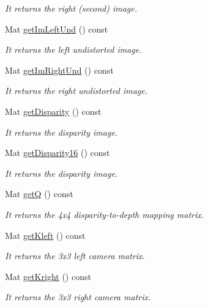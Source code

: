 \begin{DoxyCompactItemize}
\begin{DoxyCompactList}\small\item\em It returns the right (second) image. \end{DoxyCompactList}\item 
Mat \hyperlink{classStereoCamera_a8beef7e6d56b98f531ceeb2ed6778c28}{get\+Im\+Left\+Und} () const 
\begin{DoxyCompactList}\small\item\em It returns the left undistorted image. \end{DoxyCompactList}\item 
Mat \hyperlink{classStereoCamera_a915c0da2c83bca6776152e8d0205e9d1}{get\+Im\+Right\+Und} () const 
\begin{DoxyCompactList}\small\item\em It returns the right undistorted image. \end{DoxyCompactList}\item 
Mat \hyperlink{classStereoCamera_a7e9dc528c0a2b8d587fbe80738063a34}{get\+Disparity} () const 
\begin{DoxyCompactList}\small\item\em It returns the disparity image. \end{DoxyCompactList}\item 
Mat \hyperlink{classStereoCamera_af77824b3c5785cac11e585ef698c2537}{get\+Disparity16} () const 
\begin{DoxyCompactList}\small\item\em It returns the disparity image. \end{DoxyCompactList}\item 
Mat \hyperlink{classStereoCamera_a7de1dc2bd3416e4d9dcb4f6a373297b5}{get\+Q} () const 
\begin{DoxyCompactList}\small\item\em It returns the 4x4 disparity-\/to-\/depth mapping matrix. \end{DoxyCompactList}\item 
Mat \hyperlink{classStereoCamera_aef0ec58b3e5cf02f7b925340c57ee477}{get\+Kleft} () const 
\begin{DoxyCompactList}\small\item\em It returns the 3x3 left camera matrix. \end{DoxyCompactList}\item 
Mat \hyperlink{classStereoCamera_a6c2d8ae33c7e8f1e8e4d6f38ffe65b94}{get\+Kright} () const 
\begin{DoxyCompactList}\small\item\em It returns the 3x3 right camera matrix. \end{DoxyCompactList}\item 

\end{DoxyCompactItemize}
